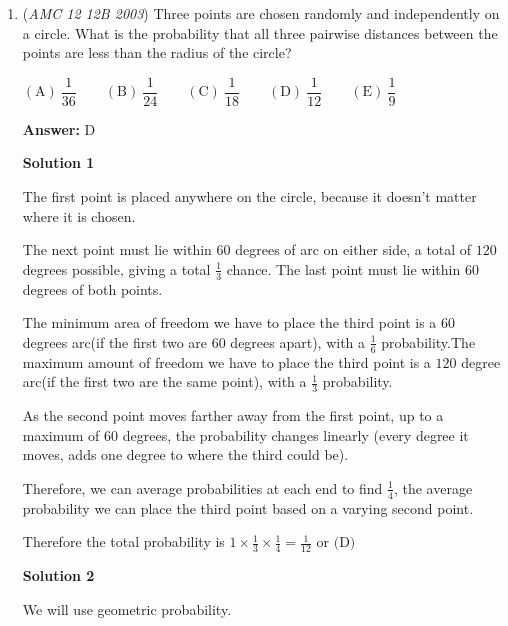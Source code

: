 \begin{enumerate}
 \textbf{Conclusion} We just showed that whenever $c<1002$, the system has at least two different solutions: one with $x\leq a$ and one with $x>a$. 

 We also showed that for $c=1002$ there are some $a,b$ for which the system has exactly one solution. 

 Hence the optimal value of $c$ is $\boxed{\mathrm{(C)}\ 1002}$.

 


	\item (\textit{AMC 12 12B 2003}) Three points are chosen randomly and independently on a circle. What is the probability that all three pairwise distances between the points are less than the radius of the circle?


 $\mathrm{(A)}\ \dfrac{1}{36} \qquad\mathrm{(B)}\ \dfrac{1}{24} \qquad\mathrm{(C)}\ \dfrac{1}{18} \qquad\mathrm{(D)}\ \dfrac{1}{12} \qquad\mathrm{(E)}\ \dfrac{1}{9}$

 \textbf{Answer: }D



\textbf{Solution 1}

The first point is placed anywhere on the circle, because it doesn't matter where it is chosen.

 The next point must lie within $60$ degrees of arc on either side, a total of $120$ degrees possible, giving a total $\frac{1}{3}$ chance. The last point must lie within $60$ degrees  of both points. 

 The minimum area of freedom we have to place the third point is a $60$ degrees arc(if the first two are $60$ degrees apart), with a $\frac{1}{6}$ probability.The maximum amount of freedom we have to place the third point is a $120$ degree arc(if the first two are the same point), with a $\frac{1}{3}$ probability.  

 As the second point moves farther away from the first point, up to a maximum of $60$ degrees, the probability changes linearly (every degree it moves, adds one degree to where the third could be).

 Therefore, we can average probabilities at each end to find $\frac{1}{4}$, the average probability we can place the third point based on a varying second point.

 Therefore the total probability is $1\times\frac{1}{3}\times\frac{1}{4}=\frac{1}{12}$ or $\boxed{\text{(D)}}$




\textbf{Solution 2}

We will use geometric probability.


\end{enumerate}
